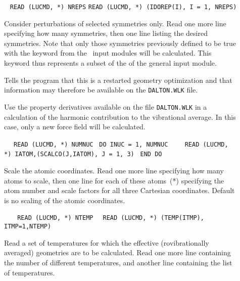 \begin{description}
\item[]\verb| |\newline
\verb|READ (LUCMD, *) NREPS|\newline
\verb|READ (LUCMD, *) (IDOREP(I), I = 1, NREPS)|

Consider perturbations of selected
symmetries only.  Read one more line specifying how many
symmetries, then one line listing the desired symmetries. Note that
only those symmetries previously defined to be true with the keyword
 from the \aba\ input modules will be calculated. This
keyword thus represents a subset of the  of the general
input module.

\item[] Tells the program that this is a restarted
geometry optimization and that
information may therefore be available
on the \verb|DALTON.WLK| file.

\item[] Use the property derivatives available on the file
\verb|DALTON.WLK| in a calculation of the harmonic contribution to the
vibrational average. In this case, only a new force field will be calculated.

\item[]\verb| |\newline
\verb| READ (LUCMD, *) NUMNUC|\newline
\verb| DO INUC = 1, NUMNUC|\newline
\verb|    READ (LUCMD, *) IATOM,(SCALCO(J,IATOM), J = 1, 3)|\newline
\verb| END DO|

Scale the atomic coordinates.  Read one more
line specifying how many atoms to scale, then one line for
each of these atoms~(*) specifying the atom number and scale
factors for all three Cartesian coordinates. Default is no scaling of
the atomic coordinates.


\item[]\verb| |\newline
\verb|  READ (LUCMD, *) NTEMP|\newline
\verb|  READ (LUCMD, *) (TEMP(ITMP), ITMP=1,NTEMP)|

Read a set of temperatures for which the
effective (rovibrationally averaged) geometries are to be
calculated. Read one more line containing the number of different
temperatures, and another line containing the list of temperatures.


\end{description}
